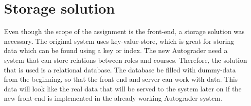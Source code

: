 \section{Storage solution}
Even though the scope of the assignment is the front-end, a storage solution was necessary. The original system uses key-value-store, which is great for storing data which can be found using a key or index. The new Autograder need a system that can store relations between roles and courses. Therefore, the solution that is used is a relational database. The database be filled with dummy-data from the beginning, so that the front-end and server can work with data. This data will look like the real data that will be served to the system later on if the new front-end is implemented in the already working Autograder system.



